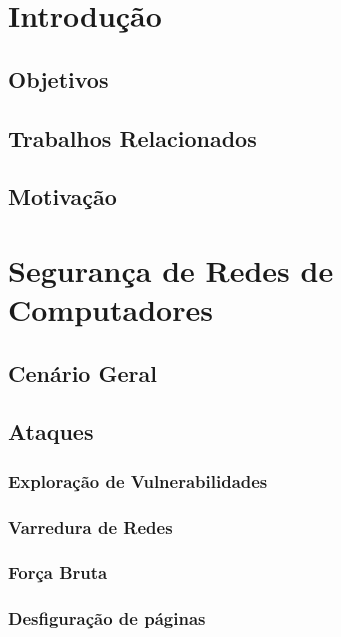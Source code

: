 \documentclass[
	12pt,				%
	openright,			%
	twoside,			%
	a4paper,			%
	english,			%
	brazil				%
	]{abntex2}
\begin{document}
\tableofcontents*
\cleardoublepage

\textual
\chapter*[Introdução]{Introdução}
\section{Objetivos}
\section{Trabalhos Relacionados}
\section{Motivação}
\chapter{Segurança de Redes de Computadores}
\section{Cenário Geral}
\section{Ataques}
\subsection{Exploração de Vulnerabilidades}
\subsection{Varredura de Redes}
\subsection{Força Bruta}
\subsection{Desfiguração de páginas}
\end{document}
